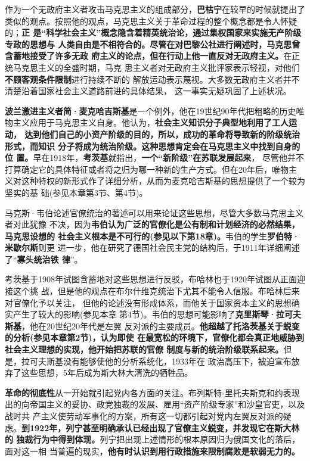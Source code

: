 作为一个无政府主义者攻击马克思主义的组成部分，\textbf{巴枯宁}在较早的时候就提出了
类似的观点。按照他的观点，马克思主义关于革命过程的整个概念都是令人怀疑的；\textbf{正
  是“科学社会主义”概念隐含着精英统治论，通过集权国家来实施无产阶级专政的思想与
  人类自由是不相符合的。尽管在对巴黎公社进行阐述时，马克思曾含蓄地接受了许多无政
  府主义的论点，但在行动上他一直反对无政府主义。}在正统马克思主义的全盛时期，马克
思主义者对无政府主义批评家表示轻视，对他们\textbf{不顾客观条件限制}进行持续不断的
解放运动表示蔑视。大多数无政府主义者并不清楚沿着国家社会主义道路前进的具体结果，
这一事实无疑巩固了上述状况。

\textbf{波兰激进主义者简·麦克哈吉斯基}是一个例外，他在19世纪90年代把粗略的历史唯
物主义应用于马克思主义自身。他认为，\textbf{社会主义知识分子典型地利用了工人运动，
  达到他们自己的小资产阶级的目的，所以，成功的革命将导致新的阶级统治形式，而知识
  分子将成为统治阶级。这种思想肯定会在马克思主义中找到自身的位
  置。}早在1918年，\textbf{考茨基}就指出，\textbf{一个“新阶级”在苏联发展起来}，
尽管他并不打算确定它的具体特征或者将之归为哪一种新的生产方式。但在20年后，唯物主
义对这种特权的新形式作了详细分析，从而为麦克哈吉斯基的思想提供了一个较为坚实的基
础(参见本章第3节、第4节)。

马克斯·韦伯论述官僚统治的著述可以用来论证这些思想，尽管大多数马克思主义者对此犹豫
不决，因为\textbf{韦伯认为广泛的官僚化是公有制和计划经济的必然结果，马克思设想的
  社会主义根本是不可行的(参见以下第18章)。}韦伯的学生\textbf{罗伯特·米歇尔斯}则更
进一步，他在研究了德国社会民主党的结构后，于1911年详细阐述了“\textbf{寡头统治铁
  律}”。

考茨基于1908年试图含蓄地对这些思想进行反驳，布哈林也于1920年试图从正面迎接这个挑
战，但是他的观点在布尔什维克统治下尤其不能令人信服。布哈林后来对官僚化予以关注，
但他的论述没有形成体系，而他关于国家资本主义的思想确实产生了较大的影响(参见本章
第4节)。韦伯的思想可能影响了\textbf{克里斯琴·拉可夫斯基}，他在20世纪20年代是左翼
反对派的主要成员。\textbf{他超越了托洛茨基关于蜕变的分析(参见本章第2节)，认为即使
  在最宽松的环境下，官僚化都会真正地威胁到社会主义理想的实现，他开始把苏联的官僚
  制度与新的统治阶级联系起来。}但是，拉可夫斯基没有能够使他的分析系统化，1933年在
政治高压下，被迫宣布放弃了这些思想，5年后成为斯大林大清洗的牺牲品。

\textbf{革命的彻底性}从一开始就引起党内各方面的关注。布列斯特-里托夫斯克和约表现
出的向帝国主义的妥协、政党独裁的发展、雇用“资产阶级专家”和沙皇官吏，以及战时共
产主义使劳动军事化的方案，所有这一切都引起对党内左翼反对派的疑
虑。\textbf{到1922年，列宁甚至明确承认已经出现了官僚主义蜕变，并发现它在斯大林的
  独裁行为中得到体现。}列宁把出现上述情形的根本原因归为俄国文化的落后，面对这一相
当普遍的现实，\textbf{他有时认识到用行政措施来限制腐败是软弱无力的。}

